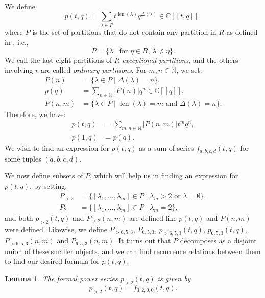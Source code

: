 \documentclass[a4paper, 12pt, reqno]{amsart}
\newtheorem{lemma}[theorem]{Lemma}
\theoremstyle{remark}
\DeclareMathOperator{\len}{len}
\begin{document}
We define
\begin{equation*}
  p(t, q) = \sum_{\lambda \in P}t^{\len(\lambda)}q^{\Delta(\lambda)} \in \mathbb{C}[[t, q]],
\end{equation*}
where $P$ is the set of partitions that do not contain any partition in $R$ as defined in , i.e.,
\begin{equation*}
  P = \{\lambda \mid \text{for $\eta \in R$, $\lambda \nsupseteq \eta$}\}.
\end{equation*}
We call the last eight partitions of $R$ \emph{exceptional partitions}, and the others involving $r$ are called \emph{ordinary partitions}.
For $m, n \in \mathbb{N}$, we set:
\begin{align*}
  P(n) &= \{\lambda \in P \mid \Delta(\lambda) = n\}, \\
  p(q) &= \sum_{n \in \mathbb{N}}|P(n)|q^n \in \mathbb{C}[[q]], \\
  P(n, m) &= \{\lambda \in P \mid \text{$\len(\lambda) = m$ and $\Delta(\lambda) = n$}\}.
\end{align*}
Therefore, we have:
\begin{align*}
  p(t, q) &= \sum_{m, n \in \mathbb{N}}|P(n, m)|t^mq^n, \\
  p(1, q) &= p(q).
\end{align*}
We wish to find an expression for $p(t, q)$ as a sum of series $f_{a, b, c, d}(t, q)$ for some tuples $(a, b, c, d)$.

We now define subsets of $P$, which will help us in finding an expression for $p(t, q)$, by setting:
\begin{align*}
  P_{>2} &= \{[\lambda_1, \dots, \lambda_m] \in P \mid \text{$\lambda_m > 2$ or $\lambda = \emptyset$}\}, \\
  P_2 &= \{[\lambda_1, \dots, \lambda_m] \in P \mid \lambda_m = 2\},
\end{align*}
and both $p_{>2}(t, q)$ and $P_{>2}(n, m)$ are defined like $p(t, q)$ and $P(n, m)$ were defined.
Likewise, we define $P_{>6, 5, 3}$, $P_{6, 5, 3}$, $p_{>6, 5, 3}(t, q)$, $p_{6, 5, 3}(t, q)$, $P_{>6, 5, 3}(n, m)$ and $P_{6, 5, 3}(n, m)$.
It turns out that $P$ decomposes as a disjoint union of these smaller objects, and we can find recurrence relations between them to find our desired formula for $p(t, q)$.

\begin{lemma}
  \label{lmm:2}
  The formal power series $p_{>2}(t, q)$ is given by
  \begin{equation*}
    p_{>2}(t, q) = f_{3, 2, 0, 0}(t, q).
  \end{equation*}
\end{lemma}
\end{document}
